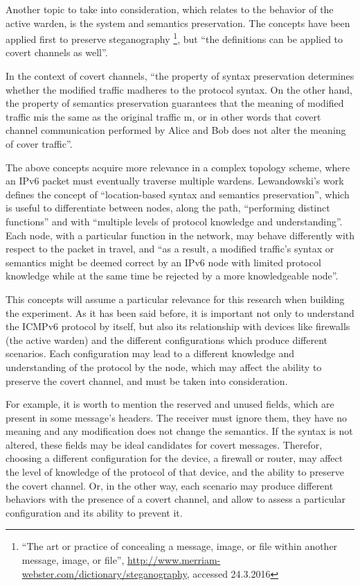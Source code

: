 \documentclass[12pt]{article}
\begin{document}
Another topic to take into consideration, which relates to the behavior of the active warden, is the system and semantics preservation. The concepts have been applied first to preserve steganography \footnote{``The art or practice of concealing a message, image, or file within another message, image, or file'', \url{http://www.merriam-webster.com/dictionary/steganography}, accessed 24.3.2016}\cite{lucena2}, but ``the definitions can be applied to covert channels as well''\cite{lewandowski}.

In the context of covert channels, ``the property of syntax preservation determines whether the modified traffic m\textprime\hspace{2pt}adheres to the protocol syntax. On the other hand, the property of semantics preservation guarantees that the meaning of modified traffic m\textprime\hspace{2pt}is the same as the original traffic m, or in other words that covert channel communication performed by Alice and Bob does not alter the meaning of cover traffic''\cite{lewandowski}.

The above concepts acquire more relevance in a complex topology scheme, where an IPv6 packet must eventually traverse multiple wardens. Lewandowski's work defines the concept of ``location-based syntax and semantics preservation'', which is useful to differentiate between nodes, along the path, ``performing distinct functions'' and with ``multiple levels of protocol knowledge and understanding''. Each node, with a particular function in the network, may behave differently with respect to the packet in travel, and ``as a result, a modified traffic’s syntax or semantics might be deemed correct by an IPv6 node with limited protocol knowledge while at  the same time be rejected by a more knowledgeable node''\cite{lewandowski}.

This concepts will assume a particular relevance for this research when building the experiment. As it has been said before, it is important not only to understand the ICMPv6 protocol by itself, but also its relationship with devices like firewalls (the active warden) and the different configurations which produce different scenarios. Each configuration may lead to a different knowledge and understanding of the protocol by the node, which may affect the ability to preserve the covert channel, and must be taken into consideration. 

For example, it is worth to mention the reserved and unused fields, which are present in some message's headers. The receiver must ignore them, they have no meaning and any modification does not change the semantics. If the syntax is not altered, these fields may be ideal candidates for covert messages\cite{lewandowski}. Therefor, choosing a different configuration for the device, a firewall or router, may affect the level of knowledge of the protocol of that device, and the ability to preserve the covert channel. Or, in the other way, each scenario may produce different behaviors with the presence of a covert channel, and allow to assess a particular configuration and its ability to prevent it.
\end{document}
